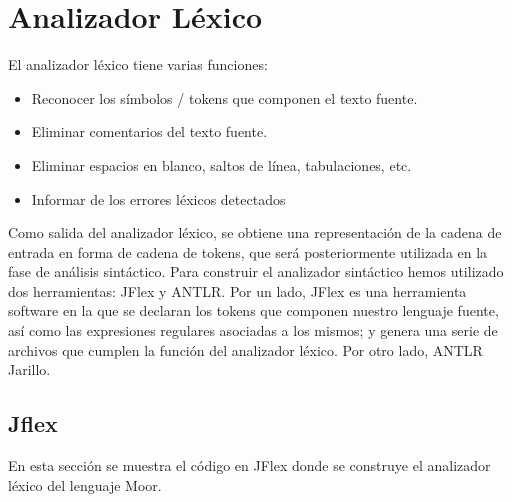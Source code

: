 \documentclass[12pt,a4paper]{article}
\begin{document}
	\clearpage

\section{Analizador Léxico}
El analizador léxico tiene varias funciones:
\begin{itemize}
	\item Reconocer los símbolos / tokens que componen el texto fuente.
	\item Eliminar comentarios del texto fuente.
	\item Eliminar espacios en blanco, saltos de línea, tabulaciones, etc.
	\item Informar de los errores léxicos detectados
\end{itemize}

Como salida del analizador léxico, se obtiene una representación de la cadena de entrada en forma de cadena de tokens, que será posteriormente utilizada en la fase de análisis sintáctico. Para construir el analizador sintáctico hemos utilizado dos herramientas: JFlex y ANTLR. 
Por un lado, JFlex es una herramienta software en la que se declaran los tokens que componen nuestro lenguaje fuente, así como las expresiones regulares asociadas a los mismos; y genera una serie de archivos que cumplen la función del analizador léxico. 
Por otro lado, ANTLR Jarillo.	
\subsection{Jflex}

En esta sección se muestra el código en JFlex donde se construye el analizador léxico del lenguaje Moor.
\end{document}

